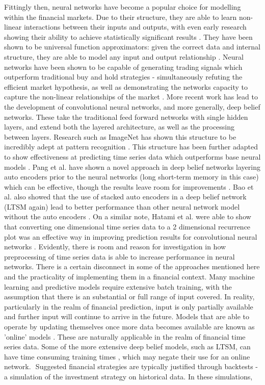 \documentclass[a4paper,latin]{paper}
\begin{document}
\hfill \break \break
Fittingly then, neural networks have become a popular choice for modelling within the financial markets. Due to their structure, they are able to learn non-linear interactions between their inputs and outputs, with even early research showing their ability to achieve statistically significant results \cite {skabar}. They have been shown to be universal function approximators: given the correct data and internal structure, they are able to model any input and output relationship \cite {hornik}. Neural networks have been shown to be capable of generating trading signals which outperform traditional buy and hold strategies - simultaneously refuting the efficient market hypothesis, as well as demonstrating the networks capacity to capture the non-linear relationships of the market \cite {skabar}. 
\hfill \break \break
More recent work has lead to the development of convolutional neural networks, and more generally, deep belief networks. These take the traditional feed forward networks with single hidden layers, and extend both the layered architecture, as well as the processing between layers. Research such as ImageNet has shown this structure to be incredibly adept at pattern recognition \cite{krizhevsky}\cite{oord}. This structure has been further adapted to show effectiveness at predicting time series data which outperforms base neural models \cite {borovykh}. 
\hfill \break \break
Pang et al. have shown a novel approach in deep belief networks layering auto encoders prior to the neural networks (long short-term memory in this case) which can be effective, though the results leave room for improvements \cite {pang}. Bao et al. also showed that the use of stacked auto encoders in a deep belief network (LTSM again) lead to better performance than other neural network model without the auto encoders \cite {bao}. On a similar note, Hatami et al. were able to show that converting one dimensional time series data to a 2 dimensional recurrence plot was an effective way in improving prediction results for convolutional neural networks \cite {hatami}. Evidently, there is room and reason for investigation in how preprocessing of time series data is able to increase performance in neural networks.
\hfill \break \break
There is a certain disconnect in some of the approaches mentioned here and the practicality of implementing them in a financial context. Many machine learning and predictive models require extensive batch training, with the assumption that there is an substantial or full range of input covered. In reality, particularly in the realm of financial prediction, input is only partially available and further input will continue to arrive in the future. Models that are able to operate by updating themselves once more data becomes available are known as 'online' models \cite {albers}. These are naturally applicable in the realm of financial time series data. Some of the more extensive deep belief models, such as LTSM, can have time consuming training times \cite {bao}, which may negate their use for an online network. \hfill \break \break Suggested financial strategies are typically justified through backtests - a simulation of the investment strategy on historical data. In these simulations, 
\end{document}
